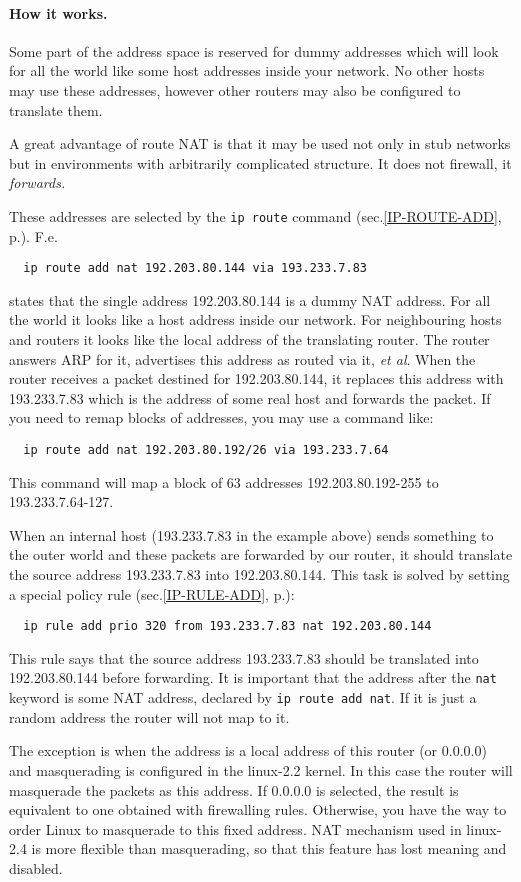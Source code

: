\paragraph{How it works.}
Some part of the address space is reserved for dummy addresses
which will look for all the world like some host addresses
inside your network. No other hosts may use these addresses,
however other routers may also be configured to translate them.
\begin{NB}
A great advantage of route NAT is that it may be used not
only in stub networks but in environments with arbitrarily complicated
structure. It does not firewall, it {\em forwards.}
\end{NB}
These addresses are selected by the \verb|ip route| command
(sec.\ref{IP-ROUTE-ADD}, p.\pageref{IP-ROUTE-ADD}). F.e.\
\begin{verbatim}
  ip route add nat 192.203.80.144 via 193.233.7.83
\end{verbatim}
states that the single address 192.203.80.144 is a dummy NAT address.
For all the world it looks like a host address inside our network.
For neighbouring hosts and routers it looks like the local address
of the translating router. The router answers ARP for it, advertises
this address as routed via it, {\em et al\/}. When the router
receives a packet destined for 192.203.80.144, it replaces 
this address with 193.233.7.83 which is the address of some real
host and forwards the packet. If you need to remap
blocks of addresses, you may use a command like:
\begin{verbatim}
  ip route add nat 192.203.80.192/26 via 193.233.7.64
\end{verbatim}
This command will map a block of 63 addresses 192.203.80.192-255 to
193.233.7.64-127.

When an internal host (193.233.7.83 in the example above)
sends something to the outer world and these packets are forwarded
by our router, it should translate the source address 193.233.7.83
into 192.203.80.144. This task is solved by setting a special
policy rule (sec.\ref{IP-RULE-ADD}, p.\pageref{IP-RULE-ADD}):
\begin{verbatim}
  ip rule add prio 320 from 193.233.7.83 nat 192.203.80.144
\end{verbatim}
This rule says that the source address 193.233.7.83
should be translated into 192.203.80.144 before forwarding.
It is important that the address after the \verb|nat| keyword
is some NAT address, declared by {\tt ip route add nat}.
If it is just a random address the router will not map to it.
\begin{NB}
The exception is when the address is a local address of this
router (or 0.0.0.0) and masquerading is configured in the linux-2.2
kernel. In this case the router will masquerade the packets as this address.
If 0.0.0.0 is selected, the result is equivalent to one
obtained with firewalling rules. Otherwise, you have the way
to order Linux to masquerade to this fixed address.
NAT mechanism used in linux-2.4 is more flexible than
masquerading, so that this feature has lost meaning and disabled.
\end{NB}

